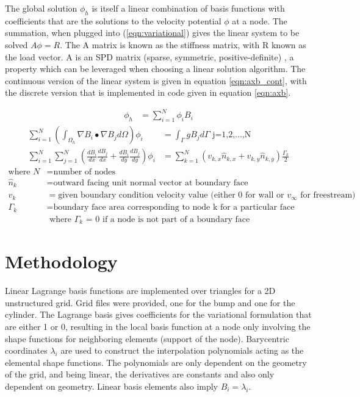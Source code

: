\documentclass[conf]{new-aiaa}
\begin{document}
The global solution $\phi_h$ is itself a linear combination of basis functions with coefficients that are the solutions to the velocity potential $\phi$ at a node.  The summation, when plugged into (\ref{eqn:variational}) gives the linear system to be solved $A\phi = R$.  The A matrix is known as the stiffness matrix, with R known as the load vector.  A is an SPD matrix (sparse, symmetric, positive-definite) \cite{luo}, a property which can be leveraged when choosing a linear solution algorithm.  The continuous version of the linear system is given in equation \ref{eqn:axb_cont}, with the discrete version that is implemented in code given in equation \ref{eqn:axb}.  

\begin{align}
	\phi_h &= \sum_{i=1}^N \phi_i B_i
\end{align}
\begin{align}
	\sum_{i=1}^N \left( \int_{\Omega_h} \nabla B_i \bullet \nabla B_j d\Omega \right) \phi_i &= \int_{\Gamma} gB_j d\Gamma \text{\ \ \ \ \ j=1,2,...,N} \label{eqn:axb_cont} \\
	\sum_{i=1}^N \sum_{j=1}^N \left( \frac{dB_i}{dx}\frac{dB_j}{dx} + \frac{dB_i}{dy}\frac{dB_j}{dy}  \right) \phi_i &= \sum_{k=1}^N (v_{k,x} \hat{n}_{k,x} + v_{k,y} \hat{n}_{k,y}) \frac{\Gamma_k}{2} \label{eqn:axb}
\end{align}
\begin{align*}
	\text{where\ \ \ \ }
	N &= \text{number of nodes} \\
	\hat{n}_k &= \text{outward facing unit normal vector at boundary face} \\
	v_k &= \text{given boundary condition velocity value (either 0 for wall or $v_{\infty}$ for freestream)} \\
	\Gamma_k &= \text{boundary face area corresponding to node k for a particular face}\\
		& \text{\ \ \ \ \ where $\Gamma_k$ = 0 if a node is not part of a boundary face}
\end{align*}

\section{Methodology}
\bigskip

Linear Lagrange basis functions are implemented over triangles for a 2D unstructured grid.  Grid files were provided, one for the bump and one for the cylinder.  The Lagrange basis gives coefficients for the variational formulation that are either 1 or 0, resulting in the local basis function at a node only involving the shape functions for neighboring elements (support of the node).  Barycentric coordinates $\lambda_i$ are used to construct the interpolation polynomials acting as the elemental shape functions.  The polynomials are only dependent on the geometry of the grid, and being linear, the derivatives are constants and also only dependent on geometry.  Linear basis elements also imply $B_i=\lambda_i$.
\end{document}
